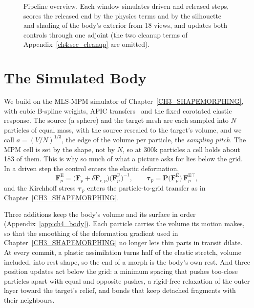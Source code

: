 \begin{figure}[t]
    \centering
    \resizebox{\textwidth}{!}{}
    \caption{Pipeline overview. \textmd{Each window simulates driven and released steps, scores the released end by the
    physics terms and by the silhouette and shading of the body's exterior from 18 views, and updates both controls
    through one adjoint (the two cleanup terms of Appendix~\ref{ch4:sec_cleanup} are omitted).}}
    \label{fig:overview}
\end{figure}

\section{The Simulated Body}
\label{ch4:sec_body}

We build on the MLS-MPM simulator of Chapter~\ref{CH3_SHAPEMORPHING}, with cubic B-spline weights, APIC
transfers~\citep{jiang2016material} and the fixed corotated elastic response. The source (a sphere) and the target mesh
are each sampled into $N$ particles of equal mass, with the source rescaled to the target's volume, and we call
$a=(V/N)^{1/3}$, the edge of the volume per particle, the \emph{sampling pitch}. The MPM cell is set by the shape, not by
$N$, so at 300k particles a cell holds about 183 of them. This is why so much of what a picture asks for lies below the
grid. In a driven step the control enters the elastic deformation,
\begin{equation}
\label{eq:control_F}
\mathbf{F}^{\mathrm{E}}_p=\big(\mathbf{F}_p+\delta\mathbf{F}_{c,p}\big)\big(\mathbf{F}^{\mathrm{P}}_p\big)^{-1},
\qquad
\boldsymbol{\tau}_p=\mathbf{P}\big(\mathbf{F}^{\mathrm{E}}_p\big)\,\mathbf{F}^{\mathrm{E}\top}_p ,
\end{equation}
and the Kirchhoff stress $\boldsymbol{\tau}_p$ enters the particle-to-grid transfer as in Chapter~\ref{CH3_SHAPEMORPHING}.

Three additions keep the body's volume and its surface in order (Appendix~\ref{app:ch4_body}). Each particle carries the
volume its motion makes, so that the smoothing of the deformation gradient used in Chapter~\ref{CH3_SHAPEMORPHING} no
longer lets thin parts in transit dilate. At every commit, a plastic assimilation turns half of the elastic stretch,
volume included, into rest shape, so the end of a morph is the body's own rest. And three position updates act below the
grid: a minimum spacing that pushes too-close particles apart with equal and opposite pushes, a rigid-free relaxation of
the outer layer toward the target's relief, and bonds that keep detached fragments with their neighbours.

